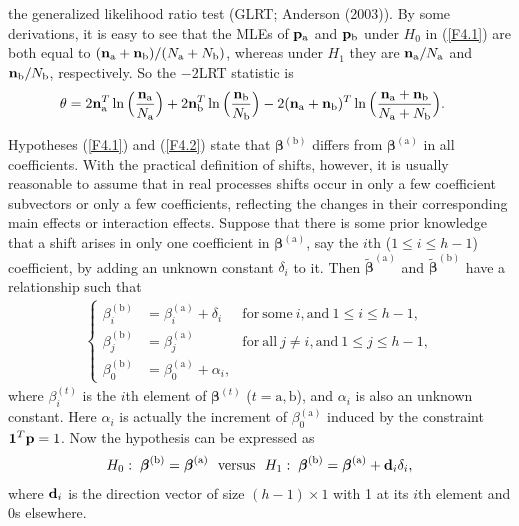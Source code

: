 the generalized likelihood ratio test (GLRT; Anderson (2003)). By some derivations,
it is easy to see that the MLEs of ${\bf p}_{\mathrm{a}}$ and ${\bf p}_{\mathrm{b}}$
under $H_0$ in (\ref{F4.1}) are both equal to $({\bf n}_{\mathrm{a}}+{\bf
n}_{\mathrm{b}})/(N_{\mathrm{a}}+N_{\mathrm{b}})$, whereas under $H_1$ they are
${\bf n}_{\mathrm{a}}/N_{\mathrm{a}}$ and ${\bf n}_{\mathrm{b}}/N_{\mathrm{b}}$,
respectively. So the $-2$LRT statistic is
\begin{align}\label{F4.3}
\theta&=2{\bf n}_{\mathrm{a}}^T\ln\Big(\frac{{\bf
n}_{\mathrm{a}}}{N_{\mathrm{a}}}\Big)+2{\bf n}_{\mathrm{b}}^T\ln\Big(\frac{{\bf
n}_{\mathrm{b}}}{N_{\mathrm{b}}}\Big)-2({\bf n}_{\mathrm{a}}+{\bf
n}_{\mathrm{b}})^T\ln\Big(\frac{{\bf n}_{\mathrm{a}}+{\bf
n}_{\mathrm{b}}}{N_{\mathrm{a}}+N_{\mathrm{b}}}\Big).
\end{align}

Hypotheses (\ref{F4.1}) and (\ref{F4.2}) state that $\bm{\beta}^{(\mathrm{b})}$
differs from $\bm{\beta}^{(\mathrm{a})}$ in all coefficients. With the practical
definition of shifts, however, it is usually reasonable to assume that in real
processes shifts occur in only a few coefficient subvectors or only a few
coefficients, reflecting the changes in their corresponding main effects or
interaction effects. Suppose that there is some prior knowledge that a shift arises
in only one coefficient in $\bm{\beta}^{(\mathrm{a})}$, say the $i$th ($1\leq i\leq
h-1$) coefficient, by adding an unknown constant $\delta_i$ to it. Then
$\widetilde{\bm\beta}^{(\mathrm{a})}$ and $\widetilde{\bm\beta}^{(\mathrm{b})}$ have
a relationship such that
\begin{align}
\left\{
\begin{array}{rll}
\beta^{(\mathrm{b})}_i&\!\!\!\!=\beta^{(\mathrm{a})}_i+\delta_i&\mathrm{for\ some}\ i,\mathrm{and}\ 1\leq i\leq h-1,\\
\beta^{(\mathrm{b})}_j&\!\!\!\!=\beta^{(\mathrm{a})}_j&\mathrm{for\ all}\ j\neq i, \mathrm{and}\ 1\leq j\leq h-1,\\
\beta^{(\mathrm{b})}_0&\!\!\!\!=\beta^{(\mathrm{a})}_0+\alpha_i,&
\end{array}
\right.\label{F4.4}
\end{align}
where $\beta^{(t)}_i$ is the $i$th element of $\bm\beta^{(t)}$
($t=\mathrm{a},\mathrm{b}$), and $\alpha_i$ is also an unknown constant. Here
$\alpha_i$ is actually the increment of $\beta^{(\mathrm{a})}_0$ induced by the
constraint $\boldsymbol{1}^T{\bf p}=1$. Now the hypothesis can be expressed as
\begin{align}\label{F4.5}
H_0:\;\bm{\beta}^{(\mathrm{b})}=\bm{\beta}^{(\mathrm{a})}\ \ \mbox{versus}\ \
H_1:\;\bm{\beta}^{(\mathrm{b})}=\bm{\beta}^{(\mathrm{a})}+{\bf d}_i\delta_i,
\end{align}
where ${\bf d}_i$ is the direction vector of size $(h-1)\times 1$ with 1 at its
$i$th element and 0s elsewhere.

